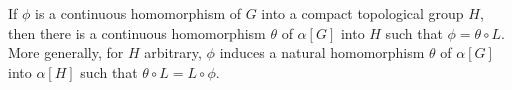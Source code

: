 If $\phi$ is a continuous homomorphism of $G$ into a compact topological group $H$, then there is a continuous homomorphism $\theta$ of $\alpha[G]$ into $H$ such that $\phi = \theta \circ L$. More generally, for $H$ arbitrary, $\phi$ induces a natural homomorphism $\theta$ of $\alpha[G]$ into $\alpha[H]$ such that $\theta \circ L = L \circ \phi$.

